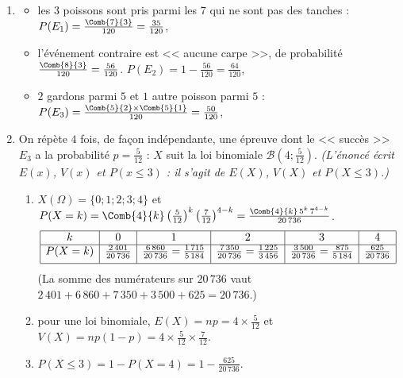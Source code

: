 	\begin{enumerate}
		\item \begin{itemize}
			\item {} les $3$ poissons sont pris parmi les $7$ qui ne sont pas des tanches :
				$P(E_1) = \frac{\Comb{7}{3}}{120} = \frac{35}{120}$, 
			\item {} l'événement contraire est << aucune carpe >>, de probabilité $\frac{\Comb{8}{3}}{120} = \frac{56}{120}$.
				$P(E_2) = 1 - \frac{56}{120} = \frac{64}{120}$, 
			\item {} $2$ gardons parmi $5$ et $1$ autre poisson parmi $5$ :
				$P(E_3) = \frac{\Comb{5}{2}\times\Comb{5}{1}}{120} = \frac{50}{120}$, 
		\end{itemize}
		\item On répète $4$ fois, de façon indépendante, une épreuve dont le << succès >> $E_3$ a la probabilité $p = \frac{5}{12}$ :
			$X$ suit la loi binomiale $\mathscr{B}\left(4;\frac{5}{12}\right)$.
			\textit{(L'énoncé écrit $E(x)$, $V(x)$ et $P(x\leq 3)$ : il s'agit de $E(X)$, $V(X)$ et $P(X \leq 3)$.)}
			\begin{enumerate}
				\item {} $X(\Omega) = \{0;1;2;3;4\}$ et
					$P(X = k) = \Comb{4}{k}\left(\frac{5}{12}\right)^k\left(\frac{7}{12}\right)^{4-k} = \frac{\Comb{4}{k}\,5^k\,7^{4-k}}{20\,736}$.
					\[
					\begin{array}{|c|c|c|c|c|c|}
						\hline
						k & 0 & 1 & 2 & 3 & 4 \\ \hline
						P(X=k) & \frac{2\,401}{20\,736} & \frac{6\,860}{20\,736} = \frac{1\,715}{5\,184} & \frac{7\,350}{20\,736} = \frac{1\,225}{3\,456}
							& \frac{3\,500}{20\,736} = \frac{875}{5\,184} & \frac{625}{20\,736} \\[1ex] \hline
					\end{array}
					\]
					(La somme des numérateurs sur $20\,736$ vaut $2\,401 + 6\,860 + 7\,350 + 3\,500 + 625 = 20\,736$.)
				\item {}
					pour une loi binomiale, $E(X) = np = 4 \times \frac{5}{12}$ et $V(X) = np(1-p) = 4\times\frac{5}{12}\times\frac{7}{12}$.

				\item {}
					$P(X \leq 3) = 1 - P(X = 4) = 1 - \frac{625}{20\,736}$.

			\end{enumerate}
	\end{enumerate}
